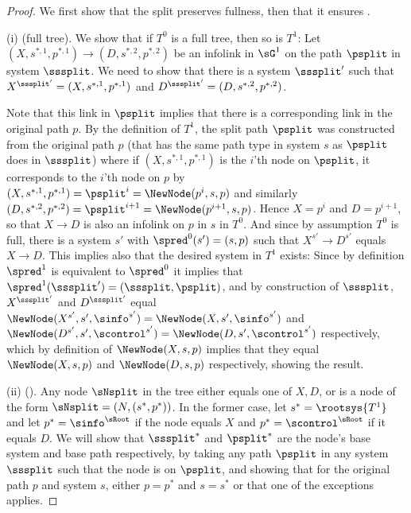 \begin{proof} We first show that the split preserves fullness, then that it ensures \systemsAndPathsUniqueness.

    (i) {(full tree)}. 
    We show that if ${T^0}$ is a full tree, then so is $T^1$: 
    Let $(X,s^{*,1},p^{*,1}) \to (D,s^{*,2},p^{*,2})$ be an infolink in $\sG^1$ on the path $\psplit$ in system $\sssplit$. We need to show that there is a system $\sssplit'$ such that $X^{\sssplit'}=(X,s^{*,1},p^{*,1})$ and $D^{\sssplit'}=(D,s^{*,2},p^{*,2})$. 
    
    Note that this link in $\psplit$ implies that there is a corresponding link in the original path $p$. By the definition of $T^1$, the split path $\psplit$ was constructed from the original path $p$ (that has the same path type in system $s$ as $\psplit$ does in $\sssplit$) where if $(X,s^{*,1},p^{*,1})$ is the $i$'th node on $\psplit$, it corresponds to the $i$'th node on $p$ by $(X,s^{*,1},p^{*,1})=\psplit^i=\NewNode(p^i,s,p)$ and similarly $(D,s^{*,2},p^{*,2})=\psplit^{i+1}=\NewNode(p^{i+1},s,p)$. Hence $X=p^i$ and $D=p^{i+1}$, so that $X\to D$ is also an infolink on $p$ in $s$ in ${T^0}$.
    And since by assumption ${T^0}$ is full, there is a system $s'$ with $\spred^0(s')= (s,p)$ such that $X^{s'} \to D^{s'}$ equals $X \to D$. This implies also that the desired system in $T^1$ exists: Since by definition $\spred^1$ is equivalent to $\spred^0$ it implies that $\spred^1(\sssplit')= (\sssplit,\psplit)$, and by construction of $\sssplit$,   $X^{\sssplit'}$ and $D^{\sssplit'}$ equal $\NewNode(X^{s'},s',\sinfo^{s'})=\NewNode(X,s',\sinfo^{s'})$ and $\NewNode(D^{s'},s',\scontrol^{s'})=\NewNode(D,s',\scontrol^{s'})$ respectively, which by definition of $\NewNode(X,s,p)$ implies that they equal $\NewNode(X,s,p)$ and $\NewNode(D,s,p)$ respectively, showing the result. 
    
    {(ii)} {(\systemsAndPathsUniqueness)}.
    \newcommand{\uspindprop}{\mathcal P}
    Any node $\sNsplit$ in the tree either equals one of $X,D$, or is a node of the form $\sNsplit=(N,(s^*,p^*))$. In the former case, let $s^*=\rootsys{T^1}$ and let $p^*=\sinfo^{\sRoot}$ if the node equals $X$ and $p^*=\scontrol^{\sRoot}$ if it equals $D$. We will show that $\sssplit^*$ and $\psplit^*$ are the node's base system and base path respectively, by taking any path $\psplit$ in any system $\sssplit$ such that the node is on $\psplit$, and showing that for the original path $p$ and system $s$, either $p=p^*$ and $s=s^*$ or that one of the exceptions applies.
    

\end{proof}
